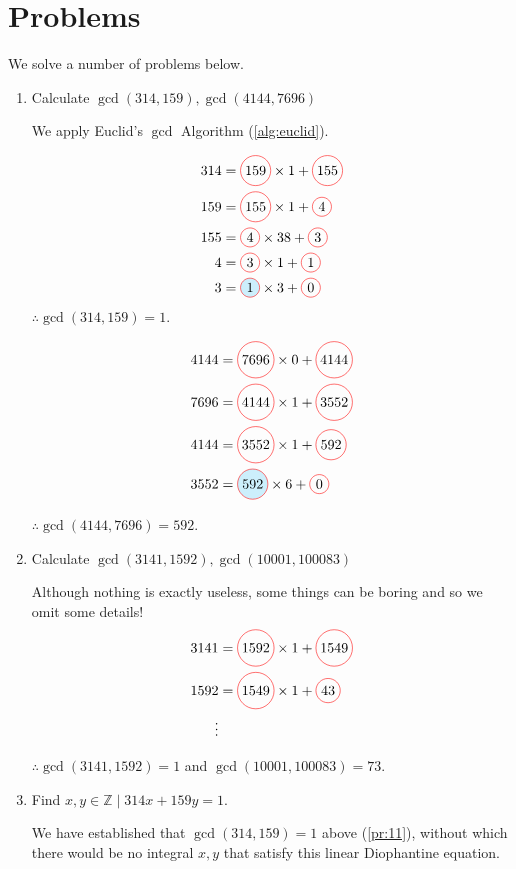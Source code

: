 \documentclass[english,notitlepage,smartquotes]{hgbreport}
\theoremstyle{definition}
\theoremstyle{remark}
\theoremstyle{plain}
\newcommand*\circled[1]{\tikz[baseline=(char.base)]{
    \node[shape=circle,draw=red,inner sep=2pt] (char) {#1};}}
\newcommand*\fillcircled[2]{\tikz[baseline=(char.base)]{
    \node[shape=circle,fill=#2,draw=red,inner sep=2pt] (char) {#1};}}
\begin{document}
\section*{Problems}
\label{sec:p1}
We solve a number of problems below.
\begin{enumerate}[label=\textbf{\arabic*}.]
\item Calculate $\gcd(314,159),\gcd(4144,7696)$
\label{pr:11}

We apply Euclid's $\gcd$ Algorithm (\ref{alg:euclid}).

\begin{align*}
314&=\circled{159}\times 1+\circled{155}\\
159&=\circled{155}\times 1+\circled{4}\\
155&=\circled{4}\times 38+\circled{3}\\
4&=\circled{3}\times 1+\circled{1}\\
3&=\fillcircled{1}{cyan!20}\times 3+\circled{0}
\end{align*}
$\therefore \gcd(314,159)=1$.

\begin{align*}
4144&=\circled{7696}\times 0+\circled{4144}\\
7696&=\circled{4144}\times 1+\circled{3552}\\
4144&=\circled{3552}\times 1+\circled{592}\\
3552&=\fillcircled{592}{cyan!20}\times 6+\circled{0}\\
\end{align*}

$\therefore \gcd(4144,7696)=592$.

\item Calculate $\gcd(3141,1592),\gcd(10001,100083)$
\label{pr:12}

Although nothing is exactly useless, some things can be boring and so we omit some details!
\begin{align*}
3141&=\circled{1592}\times 1+\circled{1549}\\
1592&=\circled{1549}\times 1+\circled{43}\\
\vdots
\end{align*}

$\therefore \gcd(3141,1592)=1$ and $\gcd(10001,100083)=73$.

\item Find $x,y\in\mathbb{Z}\mid 314x+159y=1$.\\
\label{pr:13}

We have established that $\gcd(314,159)=1$ above (\ref{pr:11}), without which there would be no integral $x,y$ that satisfy this linear Diophantine equation.


\end{enumerate}
\end{document}
